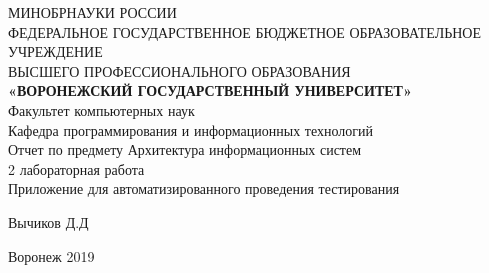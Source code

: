\documentclass{article}
\begin{document}
\begin{center}
\hfill \break
\large{МИНОБРНАУКИ РОССИИ}\\
\footnotesize{ФЕДЕРАЛЬНОЕ ГОСУДАРСТВЕННОЕ БЮДЖЕТНОЕ ОБРАЗОВАТЕЛЬНОЕ УЧРЕЖДЕНИЕ}\\ 
\footnotesize{ВЫСШЕГО ПРОФЕССИОНАЛЬНОГО ОБРАЗОВАНИЯ}\\
\small{\textbf{«ВОРОНЕЖСКИЙ ГОСУДАРСТВЕННЫЙ УНИВЕРСИТЕТ»}}\\
\hfill \break
\normalsize{Факультет компьютерных наук}\\
    \hfill \break
\normalsize{Кафедра программирования и информационных технологий}\\
\hfill\break
\hfill \break
\hfill \break
\hfill \break
\large{Отчет по предмету Архитектура информационных систем
\\2 лабораторная работа
\\Приложение для автоматизированного проведения тестирования}\\
\end{center}

\hfill \break
\hfill \break
\hfill \break
\hfill \break
\hfill \break

\begin{flushright} Вычиков Д.Д \end{flushright}
\vspace*{\fill}
\begin{center} Воронеж 2019 \end{center}
\thispagestyle{empty}
\newpage
\end{document}
